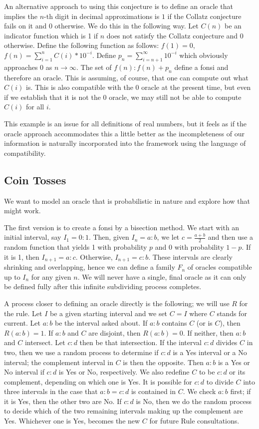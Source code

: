 \documentclass[12pt]{article}
\theoremstyle{remark}
\begin{document}
An alternative approach to using this conjecture is to define an oracle that implies the $n$-th digit in decimal approximations is $1$ if the Collatz conjecture fails on it and $0$ otherwise. We do this in the following way. Let $C(n)$ be an indicator function which is 1 if $n$ does not satisfy the Collatz conjecture and 0 otherwise. Define the following function as follows: $f(1) = 0$,  $f(n) = \sum_{i=1}^n C(i)*10^{-i} $. Define $p_n =\sum_{i=n+1}^{\infty} 10^{-i}$ which obviously approaches $0$ as $n \to \infty$. The set of $f(n): f(n) + p_n $ define a fonsi and therefore an oracle. This is assuming, of course, that one can compute out what $C(i)$ is. This is also compatible with the 0 oracle at the present time, but even if we establish that it is not the 0 oracle, we may still not be able to compute $C(i)$ for all $i$. 

This example is an issue for all definitions of real numbers, but it feels as if the oracle approach accommodates this a little better as the incompleteness of our information is naturally incorporated into the framework using the language of compatibility.

\subsection{Coin Tosses}

We want to model an oracle that is probabilistic in nature and explore how that might work. 

The first version is to create a fonsi by a bisection method. We start with an initial interval, say $I_1 = 0:1$. Then, given $I_n = a:b$, we let $c = \tfrac{a+b}{2}$ and then use a random function that yields 1 with probability $p$ and 0 with probability $1-p$. If it is 1, then $I_{n+1} = a:c$. Otherwise, $I_{n+1} = c:b$. These intervals are clearly shrinking and overlapping, hence we can define a family $F_n$ of oracles compatible up to $I_n$ for any given $n$. We will never have a single, final oracle as it can only be defined fully after this infinite subdividing process completes. 

A process closer to defining an oracle directly is the following; we will use $R$ for the rule. Let $I$ be a given starting interval and we set $C=I$ where $C$ stands for current. Let $a:b$ be the interval asked about. If $a:b$ contains $C$ (or is $C$), then $R(a:b) = 1$. If $a:b$ and $C$ are disjoint, then $R(a:b) = 0$. If neither, then $a:b$ and $C$ intersect. Let $c:d$ then be that intersection. If the interval $c:d$ divides $C$ in two, then we use a random process to determine if $c:d$ is a Yes interval or a No interval; the complement interval in $C$ is then the opposite. Then $a:b$ is a Yes or No interval if $c:d$ is Yes or No, respectively. We also redefine $C$ to be $c:d$ or its complement, depending on which one is Yes. It is possible for $c:d$ to divide $C$ into three intervals in the case that $a:b=c:d$ is contained in $C$. We check $a:b$ first; if it is Yes, then the other two are No. If $c:d$ is No, then we do the random process to decide which of the two remaining intervals making up the complement are Yes. Whichever one is Yes, becomes the new $C$ for future Rule consultations.  
\end{document}
